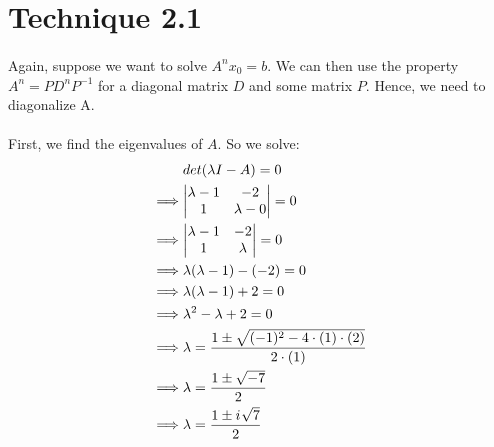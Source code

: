 \documentclass{article}
\newcommand{\iu}{{i\mkern1mu}}
\begin{document}
	\section {Technique 2.1}
    	\paragraph{}
        	Again, suppose we want to solve $A^nx_0 = b$. 
            We can then use the property $A^n = PD^nP^{-1}$ for a diagonal matrix $D$ and some matrix $P$.
            Hence, we need to diagonalize A.
        \paragraph{}
        	First, we find the eigenvalues of $A$. So we solve:
            \begin{align*}
            	         &det(\lambda I - A) = 0\\
                \implies& \text{\(\begin{vmatrix}\lambda - 1 & -2\\1 & \lambda - 0\end{vmatrix}\)} = 0\\
                \implies& \text{\(\begin{vmatrix}\lambda - 1 & -2\\1 & \lambda\end{vmatrix}\)} = 0\\
                \implies& \lambda(\lambda - 1) - (-2) = 0\\
                \implies& \lambda(\lambda - 1) + 2 = 0\\
                \implies& \lambda^2 - \lambda + 2 = 0\\
                \implies& \lambda = \frac{1 \pm \sqrt{(-1)^2 - 4 \cdot (1) \cdot (2)}}{2 \cdot (1)}\\
                \implies& \lambda = \frac{1 \pm \sqrt{-7}}{2}\\
                \implies& \lambda = \frac{1 \pm \iu\sqrt{7}}{2}\\
            \end{align*}
\end{document}
